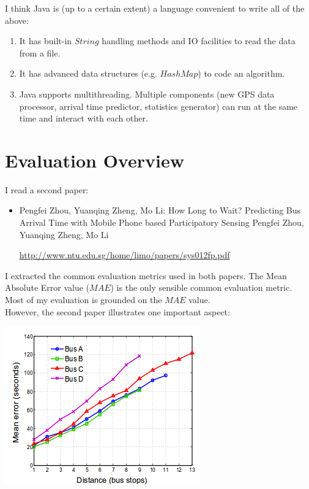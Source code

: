 \documentclass[12pt,a4paper,oneside,openright]{report}
\begin{document}
I think Java is (up to a certain extent) a language convenient to write all of the above:

\begin{enumerate}
\item It has built-in $String$ handling methods and IO facilities to read the data from a file.
\item It has advanced data structures (e.g. $HashMap$) to code an algorithm.
\item Java supports multithreading. Multiple components (new GPS data processor, arrival time
      predictor, statistics generator) can run at the same time and interact with each other.
\end{enumerate}

\newpage 

\section{Evaluation Overview}

I read a second paper:

\begin{itemize}

\item Pengfei Zhou, Yuanqing Zheng, Mo Li: How Long to Wait? Predicting Bus Arrival Time
      with Mobile Phone based Participatory Sensing Pengfei Zhou, Yuanqing Zheng, Mo Li

\textcolor{blue}{\url{http://www.ntu.edu.sg/home/limo/papers/sys012fp.pdf}}

\end{itemize}

I extracted the common evaluation metrics used in both papers. The Mean Absolute Error value
($MAE$) is the only sensible common evaluation metric. Most of my evaluation is grounded on the
$MAE$ value. \\

However, the second paper illustrates one important aspect:

\includegraphics[scale=0.8]{figs/second_paper.png}
\end{document}
